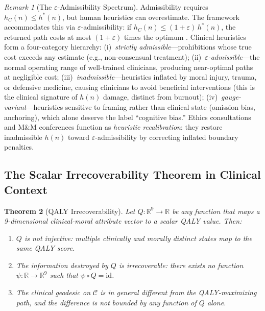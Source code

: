 \documentclass[12pt]{article}
\newtheorem{theorem}{Theorem}[section]
\theoremstyle{definition}
\theoremstyle{remark}
\newtheorem{remark}[theorem]{Remark}
\newcommand{\C}{\mathcal{C}}               %
\newcommand{\R}{\mathbb{R}}
\begin{document}
\begin{remark}[The $\varepsilon$-Admissibility Spectrum]
\label{rem:epsilon}
Admissibility requires $h_C(n) \leq h^*(n)$, but human heuristics can overestimate.  The framework accommodates this via $\varepsilon$-admissibility: if $h_C(n) \leq (1+\varepsilon)\,h^*(n)$, the returned path costs at most $(1+\varepsilon)$ times the optimum \cite{hart1968}.  Clinical heuristics form a four-category hierarchy: (i)~\emph{strictly admissible}---prohibitions whose true cost exceeds any estimate (e.g., non-consensual treatment); (ii)~\emph{$\varepsilon$-admissible}---the normal operating range of well-trained clinicians, producing near-optimal paths at negligible cost; (iii)~\emph{inadmissible}---heuristics inflated by moral injury, trauma, or defensive medicine, causing clinicians to avoid beneficial interventions (this is the clinical signature of $h(n)$ damage, distinct from burnout); (iv)~\emph{gauge-variant}---heuristics sensitive to framing rather than clinical state (omission bias, anchoring), which alone deserve the label ``cognitive bias.''  Ethics consultations and M\&M conferences function as \emph{heuristic recalibration}: they restore inadmissible $h(n)$ toward $\varepsilon$-admissibility by correcting inflated boundary penalties.
\end{remark}

\subsection{The Scalar Irrecoverability Theorem in Clinical Context}

\begin{theorem}[QALY Irrecoverability]
\label{thm:irrecoverability}
Let $Q: \R^9 \to \R$ be any function that maps a 9-dimensional clinical-moral attribute vector to a scalar QALY value.  Then:
\begin{enumerate}
    \item $Q$ is not injective: multiple clinically and morally distinct states map to the same QALY score.
    \item The information destroyed by $Q$ is irrecoverable: there exists no function $\psi: \R \to \R^9$ such that $\psi \circ Q = \mathrm{id}$.
    \item The clinical geodesic on $\C$ is in general different from the QALY-maximizing path, and the difference is not bounded by any function of $Q$ alone.
\end{enumerate}
\end{theorem}
\end{document}
